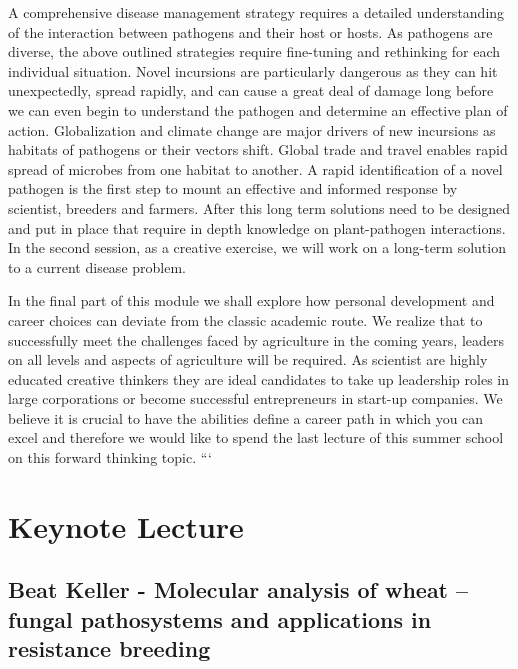 \documentclass[12pt,]{book}
\theoremstyle{definition}
\theoremstyle{definition}
\theoremstyle{remark}
\begin{document}
A comprehensive disease management strategy requires a detailed
understanding of the interaction between pathogens and their host or
hosts. As pathogens are diverse, the above outlined strategies require
fine-tuning and rethinking for each individual situation. Novel
incursions are particularly dangerous as they can hit unexpectedly,
spread rapidly, and can cause a great deal of damage long before we can
even begin to understand the pathogen and determine an effective plan of
action. Globalization and climate change are major drivers of new
incursions as habitats of pathogens or their vectors shift. Global trade
and travel enables rapid spread of microbes from one habitat to another.
A rapid identification of a novel pathogen is the first step to mount an
effective and informed response by scientist, breeders and farmers.
After this long term solutions need to be designed and put in place that
require in depth knowledge on plant-pathogen interactions. In the second
session, as a creative exercise, we will work on a long-term solution to
a current disease problem.

In the final part of this module we shall explore how personal
development and career choices can deviate from the classic academic
route. We realize that to successfully meet the challenges faced by
agriculture in the coming years, leaders on all levels and aspects of
agriculture will be required. As scientist are highly educated creative
thinkers they are ideal candidates to take up leadership roles in large
corporations or become successful entrepreneurs in start-up companies.
We believe it is crucial to have the abilities define a career path in
which you can excel and therefore we would like to spend the last
lecture of this summer school on this forward thinking topic. ```

\section*{Keynote Lecture}\label{keynote-lecture-7}

\subsection*{Beat Keller - Molecular analysis of wheat -- fungal
pathosystems and applications in resistance
breeding}\label{beat-keller---molecular-analysis-of-wheat-fungal-pathosystems-and-applications-in-resistance-breeding}
\end{document}
